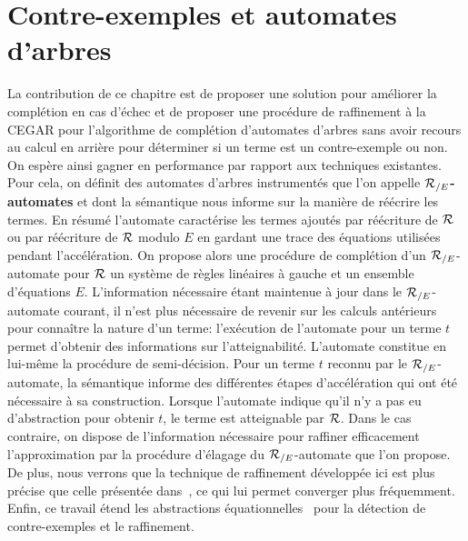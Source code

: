
\section{Contre-exemples et automates d'arbres}

La contribution de ce chapitre est de proposer une solution pour améliorer
la complétion en cas d'échec et de proposer une procédure de raffinement
à la CEGAR pour l'algorithme de complétion d'automates d'arbres sans avoir recours 
au calcul en arrière pour déterminer si un terme est un contre-exemple ou non.
On espère ainsi gagner en performance par rapport aux techniques existantes.
Pour cela, on définit des automates d'arbres instrumentés que
l'on appelle \textbf{${\mathcal R_{/E}}$-automates} et dont la sémantique 
nous informe sur la manière de réécrire les termes.
En résumé l'automate caractérise les termes ajoutés par réécriture
de $\mathcal R$ ou par réécriture de $\mathcal R$ modulo $E$ en gardant une trace
des équations utilisées pendant l'accélération.
On propose alors une procédure de complétion d'un ${\mathcal R_{/E}}$-automate
pour $\mathcal R$ un système de règles linéaires à gauche et un ensemble d'équations $E$.
L'information nécessaire étant maintenue à jour dans le ${\mathcal R_{/E}}$-automate courant, 
il n'est plus nécessaire de revenir sur les calculs antérieurs pour
connaître la nature d'un terme: l'exécution de l'automate pour un terme $t$
permet d'obtenir des informations sur l'atteignabilité. L'automate constitue en lui-même
la procédure de semi-décision.
Pour un terme $t$ reconnu par le ${\mathcal R_{/E}}$-automate, la sémantique informe des différentes étapes
d'accélération qui ont été nécessaire à sa construction. Lorsque l'automate indique qu'il n'y a
pas eu d'abstraction pour obtenir $t$, le terme est atteignable par $\mathcal R$.  Dans le cas
contraire, on dispose de l'information nécessaire pour raffiner efficacement l'approximation par la procédure 
d'élagage du ${\mathcal R_{/E}}$-automate que l'on propose.
De plus, nous verrons que la technique de raffinement développée ici est plus
précise que celle présentée dans~\cite{BCHK08}, ce qui lui permet  
converger plus fréquemment. Enfin, ce travail étend les abstractions
équationnelles~\cite{MeseguerPM-TCS08,Takai-RTA04} pour la détection
de contre-exemples et le raffinement.


